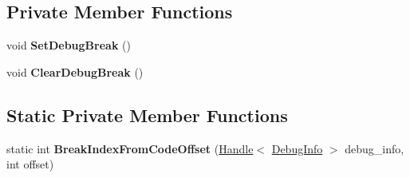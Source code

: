 \subsection*{Private Member Functions}
\begin{DoxyCompactItemize}
\item 
void {\bfseries Set\+Debug\+Break} ()\hypertarget{classv8_1_1internal_1_1_break_location_a701d25e23a53e7964f5a97d59b0f7a8d}{}\label{classv8_1_1internal_1_1_break_location_a701d25e23a53e7964f5a97d59b0f7a8d}

\item 
void {\bfseries Clear\+Debug\+Break} ()\hypertarget{classv8_1_1internal_1_1_break_location_a751d8e2ee01d144cd957f3ebe16517b4}{}\label{classv8_1_1internal_1_1_break_location_a751d8e2ee01d144cd957f3ebe16517b4}

\end{DoxyCompactItemize}
\subsection*{Static Private Member Functions}
\begin{DoxyCompactItemize}
\item 
static int {\bfseries Break\+Index\+From\+Code\+Offset} (\hyperlink{classv8_1_1internal_1_1_handle}{Handle}$<$ \hyperlink{classv8_1_1internal_1_1_debug_info}{Debug\+Info} $>$ debug\+\_\+info, int offset)\hypertarget{classv8_1_1internal_1_1_break_location_a4ef334a1dd39512df801bd014e16fd5c}{}\label{classv8_1_1internal_1_1_break_location_a4ef334a1dd39512df801bd014e16fd5c}

\end{DoxyCompactItemize}
